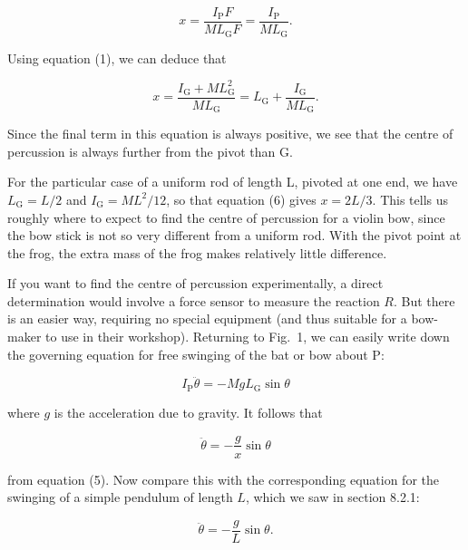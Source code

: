   
  \begin{equation*}x=\frac{I_{\mathrm{P}}F}{ML_{\mathrm{G}}F}=\frac{I_{\mathrm{P}}}{ML_{\mathrm{G}}}. 
  \tag{5}\end{equation*} 

  Using equation (1), we can deduce that 

  \begin{equation*}x=\frac{I_{\mathrm{G}}+ML_{\mathrm{G}}^2}{ML_{\mathrm{G}}} = 
  L_{\mathrm{G}}+\frac{I_{\mathrm{G}}}{ML_{\mathrm{G}}}. \tag{6}\end{equation*} 

  Since the final term in this equation is always positive, we see that the 
  centre of percussion is always further from the pivot than G. 

  For the particular case of a uniform rod of length L, pivoted at one end, we 
  have $L_{\mathrm{G}}=L/2$ and $I_{\mathrm{G}}=ML^2/12$, so that equation (6) 
  gives $x=2L/3$. This tells us roughly where to expect to find the centre of 
  percussion for a violin bow, since the bow stick is not so very different 
  from a uniform rod. With the pivot point at the frog, the extra mass of the 
  frog makes relatively little difference. 

  If you want to find the centre of percussion experimentally, a direct 
  determination would involve a force sensor to measure the reaction $R$. But 
  there is an easier way, requiring no special equipment (and thus suitable for 
  a bow-maker to use in their workshop). Returning to Fig.\ 1, we can easily 
  write down the governing equation for free swinging of the bat or bow about 
  P: 

  \begin{equation*}I_{\mathrm{P}} \ddot{\theta} = -MgL_{\mathrm{G}} \sin\theta 
  \tag{7}\end{equation*} 

  \noindent{}where $g$ is the acceleration due to gravity. It follows that 

  \begin{equation*}\ddot{\theta} =-\frac{g}{x} \sin \theta 
  \tag{8}\end{equation*} 

  \noindent{}from equation (5). Now compare this with the corresponding 
  equation for the swinging of a simple pendulum of length $L$, which we saw in 
  section 8.2.1: 

  \begin{equation*}\ddot{\theta} =-\frac{g}{L} \sin \theta. 
  \tag{9}\end{equation*} 

